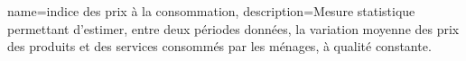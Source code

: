 {
	name=indice des prix à la consommation,
	description={Mesure statistique permettant d'estimer, entre deux périodes données, la variation moyenne des prix des produits et des services consommés par les ménages, à qualité constante.
	}
}
